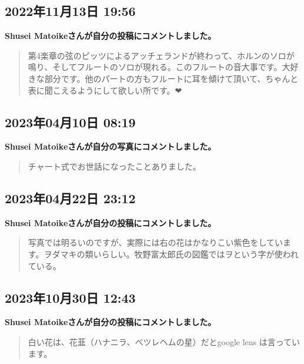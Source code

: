 \subsection*{2022年11月13日 19:56}

\textbf{Shusei Matoikeさんが自分の投稿にコメントしました。}

\begin{quote}
第4楽章の弦のピッツによるアッチェランドが終わって、ホルンのソロが鳴り、そしてフルートのソロが現れる。このフルートの音大事です。大好きな部分です。他のパートの方もフルートに耳を傾けて頂いて、ちゃんと表に聞こえるようにして欲しい所です。❤
\end{quote}

\subsection*{2023年04月10日 08:19}

\textbf{Shusei Matoikeさんが自分の写真にコメントしました。}

\begin{quote}
チャート式でお世話になったことありました。
\end{quote}

\subsection*{2023年04月22日 23:12}

\textbf{Shusei Matoikeさんが自分の投稿にコメントしました。}

\begin{quote}
写真では明るいのですが、実際には右の花はかなりこい紫色をしています。ヲダマキの類いらしい。牧野富太郎氏の図鑑ではヲという字が使われている。
\end{quote}

\subsection*{2023年10月30日 12:43}

\textbf{Shusei Matoikeさんが自分の投稿にコメントしました。}

\begin{quote}
白い花は、花韮（ハナニラ、ベツレヘムの星）だとgoogle lens は言っています。
\end{quote}

